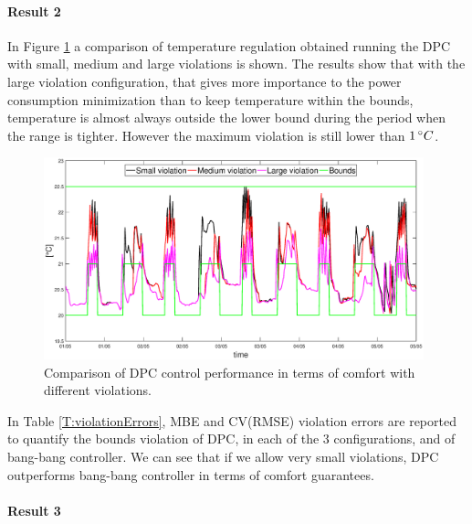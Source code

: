 \paragraph{Result 2} In Figure \ref{F:comparison_all_temperature} a comparison of temperature regulation obtained running the DPC with small, medium and large violations is shown. The results show that with the large violation configuration, that gives more importance to the power consumption minimization than to keep temperature within the bounds, temperature is almost always outside the lower bound during the period when the range is tighter. However the maximum violation is still lower than $1\,\degree C$.
\begin{figure}[t!]
	\begin{center}
		\includegraphics[width=26pc]{figures/Temperatures_all.eps}
	\end{center}
	\caption{Comparison of DPC control performance in terms of comfort with different violations.}
	\label{F:comparison_all_temperature}
\end{figure}
In Table \ref{T:violationErrors}, MBE and CV(RMSE) violation errors are reported to quantify the bounds violation of DPC, in each of the $3$ configurations, and of bang-bang controller. We can see that if we allow very small violations, DPC outperforms bang-bang controller in terms of comfort guarantees.

\paragraph{Result 3} 

